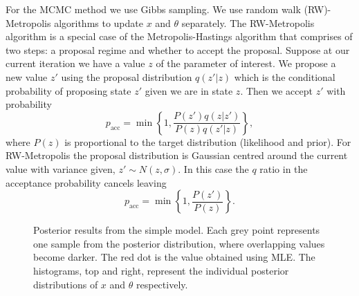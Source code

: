 \documentclass[../main.tex]{subfiles}
\begin{document}
For the MCMC method we use Gibbs sampling. We use random walk (RW)-Metropolis algorithms to update $x$ and $\theta$ separately. The RW-Metropolis algorithm is a special case of the Metropolis-Hastings algorithm that comprises of two steps: a proposal regime and whether to accept the proposal. Suppose at our current iteration we have a value $z$ of the parameter of interest. We propose a new value $z'$ using the proposal distribution $q(z' |z)$ which is the conditional probability of proposing state $z'$ given we are in state $z$. Then we accept $z'$ with probability
\begin{equation}\label{eq:MH}
p_{\mathrm{acc}} = \min \left\{ 1,\frac{P(z') q(z |z')}{P(z) q(z' |z)} \right\},
\end{equation}    
where $P(z)$ is proportional to the target distribution (likelihood and prior). For RW-Metropolis the proposal distribution is Gaussian centred around the current value with variance given, $z' \sim N(z,\sigma)$. In this case the $q$ ratio in the acceptance probability cancels leaving
 \begin{equation}
p_{\mathrm{acc}} = \min \left\{ 1,\frac{P(z') }{P(z)} \right\}.
\end{equation}  



   \begin{figure}[t]
   \hrulefill
   \begin{center} 
    \end{center}     
    \caption{Posterior results from the simple model. Each grey point represents one sample from the posterior distribution, where overlapping values become darker. The red dot is the value obtained using MLE. The histograms, top and right, represent the individual posterior distributions of $x$ and $\theta$ respectively.  }
    \label{fig:simple}
    \hrulefill
    \end{figure}
 
\end{document}
